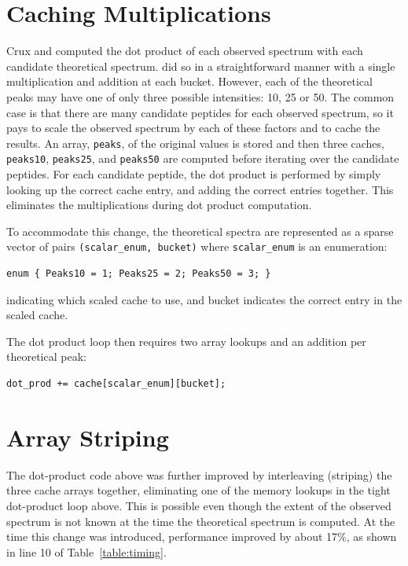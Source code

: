 \section{Caching Multiplications}

Crux and \tidezero computed the dot product of each observed spectrum
with each candidate theoretical spectrum. \tidezero did so in a
straightforward manner with a single multiplication and addition at
each bucket. However, each of the theoretical peaks may have one of
only three possible intensities: 10, 25 or 50. The common case is that
there are many candidate peptides for each observed spectrum, so it
pays to scale the observed spectrum by each of these factors and to
cache the results. An array, {\tt peaks}, of the original values is
stored and then three caches, {\tt peaks10}, {\tt peaks25}, and
{\tt peaks50} are computed before iterating over the candidate
peptides. For each candidate peptide, the dot product is performed by
simply looking up the correct cache entry, and adding the correct
entries together. This eliminates the multiplications during dot
product computation.

To accommodate this change, the theoretical spectra are represented as
a sparse vector of pairs {\tt (scalar\_enum, bucket)} where
{\tt scalar\_enum} is an enumeration:
\begin{verbatim}
enum { Peaks10 = 1; Peaks25 = 2; Peaks50 = 3; }
\end{verbatim}
indicating which scaled cache to use, and bucket indicates the correct
entry in the scaled cache.

The dot product loop then requires two array lookups and an addition
per theoretical peak:
\begin{verbatim}
dot_prod += cache[scalar_enum][bucket];
\end{verbatim}

\section{Array Striping \label{section:striping}}

The dot-product code above was further improved by interleaving (striping) the
three cache arrays together, eliminating one of the memory lookups in the tight
dot-product loop above. This is possible even though the extent of the observed
spectrum is not known at the time the theoretical spectrum is computed. At the
time this change was introduced, performance improved by about 17\%, as shown in
line 10 of Table~\ref{table:timing}.

